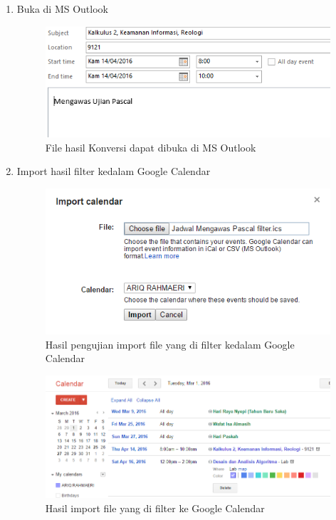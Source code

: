 \begin{enumerate}
		\item Buka di MS Outlook
			\begin{figure}[H]
			\centering
			\includegraphics[scale=0.7]{Gambar/hasilOutlook}
			\caption{File hasil Konversi dapat dibuka di MS Outlook }
			\label{fig:hasilOutlook}
			\end{figure}
		
		\item Import hasil filter kedalam Google Calendar
			\begin{figure}[H]
			\centering
			\includegraphics[scale=0.7]{Gambar/importGCFilter}
			\caption{Hasil pengujian import file yang di filter kedalam Google Calendar }
			\label{fig:importGCFilter}
			\end{figure}
			
			\begin{figure}[H]
			\centering
			\includegraphics[scale=0.7]{Gambar/hasilGCFilter}
			\caption{Hasil import file yang di filter ke Google Calendar}
			\label{fig:hasilGCFilter}
			\end{figure}
			

\end{enumerate}
